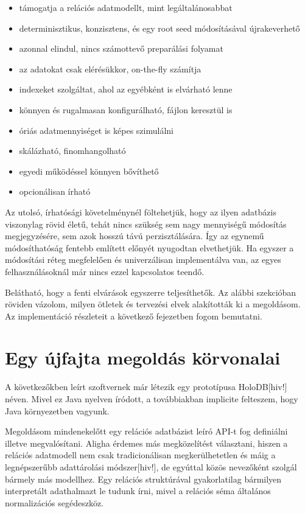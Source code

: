 \documentclass[
    parspace,
    noindent,
    nohyp,
]{elteiktdk}[2023/04/10]
\begin{document}
\begin{itemize}
    \item támogatja a relációs adatmodellt, mint legáltalánosabbat
    \item determinisztikus, konzisztens, és egy root seed módosításával újrakeverhető
    \item azonnal elindul, nincs számottevő preparálási folyamat
    \item az adatokat csak elérésükkor, on-the-fly számítja
    \item indexeket szolgáltat, ahol az egyébként is elvárható lenne
    \item könnyen és rugalmasan konfigurálható, fájlon keresztül is
    \item óriás adatmennyiséget is képes szimulálni
    \item skálázható, finomhangolható
    \item egyedi működéssel könnyen bővíthető
    \item opcionálisan írható
\end{itemize}

Az utolsó, írhatósági követelménynél föltehetjük, hogy az ilyen adatbázis viszonylag rövid életű,
tehát nincs szükség sem nagy mennyiségű módosítás megjegyzésére, sem azok hosszú távú perzisztálására.
Így az egynemű módosíthatóság fentebb említett előnyét nyugodtan elvethetjük.
Ha egyszer a módosítási réteg megfelelően és univerzálisan implementálva van,
az egyes felhasználásoknál már nincs ezzel kapcsolatos teendő.

Belátható, hogy a fenti elvárások egyszerre teljesíthetők.
Az alábbi szekcióban röviden vázolom, milyen ötletek és tervezési elvek alakították ki a megoldásom.
Az implementáció részleteit a következő fejezetben fogom bemutatni.

\section{Egy újfajta megoldás körvonalai}

A következőkben leírt szoftvernek már létezik egy prototípusa HoloDB[hiv!] néven.
Mivel ez Java nyelven íródott, a továbbiakban implicite felteszem, hogy Java környezetben vagyunk.

Megoldásom mindenekelőtt egy relációs adatbázist leíró API-t fog definiálni illetve megvalósítani.
Aligha érdemes más megközelítést választani,
hiszen a relációs adatmodell nem csak tradicionálisan megkerülhetetlen
és máig a legnépszerűbb adattárolási módszer[hiv!],
de egyúttal közös nevezőként szolgál bármely más modellhez.
Egy relációs struktúrával gyakorlatilag bármilyen interpretált adathalmazt le tudunk írni,
mivel a relációs séma általános normalizációs segédeszköz.
\end{document}
